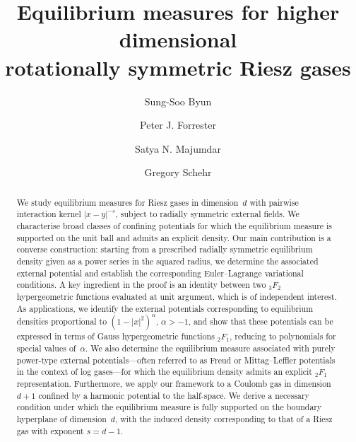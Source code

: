 \documentclass[10pt]{amsart}
\theoremstyle{plain}
\theoremstyle{remark}
\numberwithin{equation}{section}
\begin{document}
\title[Equilibrium measures for rotationally symmetric Riesz gases]{Equilibrium measures for higher dimensional \\ rotationally symmetric Riesz gases}
\author{Sung-Soo Byun}
\address{Department of Mathematical Sciences and Research Institute of Mathematics, Seoul National University, Seoul 151-747, Republic of Korea}

\author{Peter J. Forrester}
\address{School of Mathematical and Statistics, The University of Melbourne, Victoria 3010, Australia}

\author{Satya N. Majumdar} 
\address{LPTMS, CNRS, Univ. Paris-Sud, Université Paris-Saclay, 91405 Orsay, France}

\author{Gregory Schehr} 
\address{Sorbonne Universit\'e, Laboratoire de Physique Th\'eorique et Hautes Energies, CNRS UMR 7589, 4 Place Jussieu,
75252 Paris Cedex 05, France}


\begin{abstract} 
We study equilibrium measures for Riesz gases in dimension~$d$ with pairwise interaction kernel $|x-y|^{-s}$, subject to radially symmetric external fields. 
We characterise broad classes of confining potentials for which the equilibrium measure is supported on the unit ball and admits an explicit density.
Our main contribution is a converse construction: starting from a prescribed radially symmetric equilibrium density given as a power series in the squared radius, we determine the associated external potential and establish the corresponding Euler--Lagrange variational conditions. 
A key ingredient in the proof is an identity between two ${}_3F_2$ hypergeometric functions evaluated at unit argument, which is of independent interest.
As applications, we identify the external potentials corresponding to equilibrium densities proportional to $(1-|x|^2)^\alpha$, $\alpha>-1$, and show that these potentials can be expressed in terms of Gauss hypergeometric functions ${}_2F_1$, reducing to polynomials for special values of~$\alpha$. 
We also determine the equilibrium measure associated with purely power-type external potentials---often referred to as Freud or Mittag--Leffler potentials in the context of log gases---for which the equilibrium density admits an explicit ${}_2F_1$ representation.
Furthermore, we apply our framework to a Coulomb gas in dimension $d+1$ confined by a harmonic potential to the half-space. We derive a necessary condition under which the equilibrium measure is fully supported on the boundary hyperplane of dimension~$d$, with the induced density corresponding to that of a Riesz gas with exponent $s=d-1$.
\end{abstract}
\end{document}
